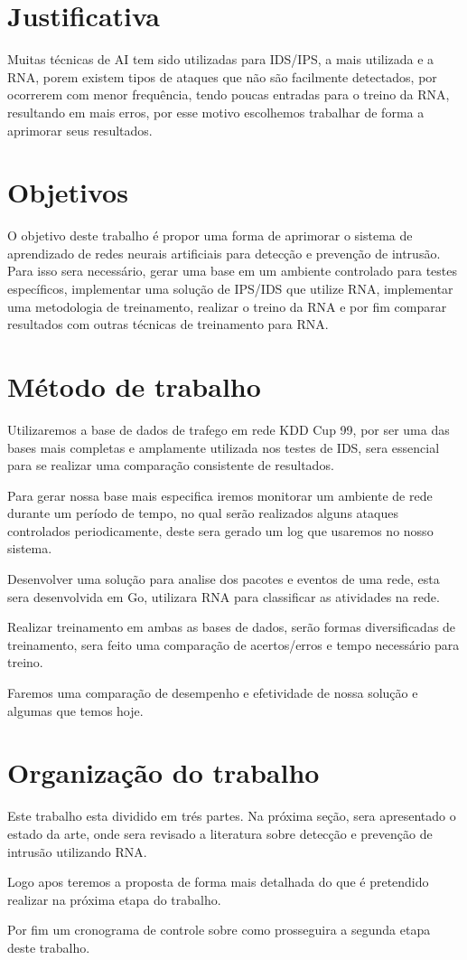 \section{Justificativa}

Muitas técnicas de AI tem sido utilizadas para IDS/IPS, a mais utilizada e a RNA\cite{Stampar}, porem existem tipos de ataques que não são facilmente detectados, por ocorrerem com menor frequência, tendo poucas entradas para o treino da RNA\cite{CeC}, resultando em mais erros,  por esse motivo escolhemos trabalhar de forma a aprimorar seus resultados. 


\section{Objetivos}

O objetivo deste trabalho é propor uma forma de aprimorar o sistema de aprendizado de redes neurais artificiais para detecção e prevenção de intrusão. 
Para isso sera necessário, gerar uma base em um ambiente controlado para testes específicos, implementar uma solução de IPS/IDS que utilize RNA, implementar uma metodologia de treinamento, realizar o treino da RNA e por fim comparar resultados com outras técnicas de treinamento para RNA.


\section{Método de trabalho}

Utilizaremos a base de dados de trafego em rede KDD Cup 99\cite{KDDCup99}, por ser uma das bases mais completas e amplamente utilizada nos testes de IDS, sera essencial para se realizar uma comparação consistente de resultados.

Para gerar nossa base mais especifica iremos monitorar um ambiente de rede durante um período de tempo, no qual serão realizados alguns ataques controlados periodicamente, deste sera gerado um log que usaremos no nosso sistema.

Desenvolver uma solução para analise dos pacotes e eventos de uma rede, esta sera desenvolvida em Go, utilizara RNA para classificar as atividades na rede.

Realizar treinamento em ambas as bases de dados, serão formas diversificadas de treinamento, sera feito uma comparação de acertos/erros e tempo necessário para treino.

Faremos uma comparação de desempenho e efetividade de nossa solução e algumas que temos hoje.

\section{Organização do trabalho}

Este trabalho esta dividido em trés partes.
Na próxima seção, sera apresentado o estado da arte, onde sera revisado a literatura sobre detecção e prevenção de intrusão utilizando RNA.

Logo apos teremos a proposta  de forma mais detalhada do que é pretendido realizar na próxima etapa do trabalho.

Por fim um cronograma de controle sobre como prosseguira a segunda etapa deste trabalho.

